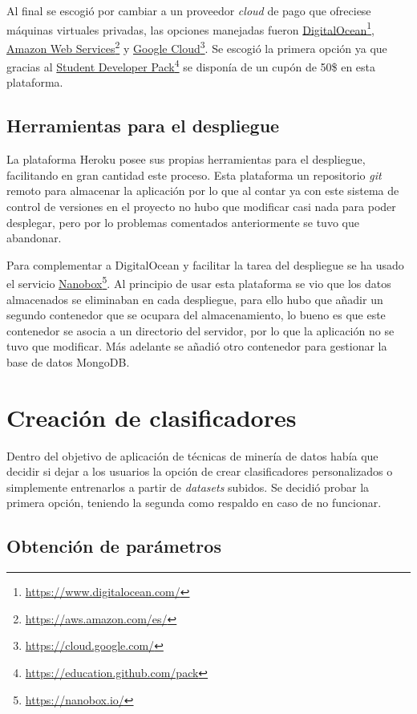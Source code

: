 Al final se escogió por cambiar a un proveedor \textit{cloud} de pago que
ofreciese máquinas virtuales privadas, las opciones manejadas fueron
\href{https://www.digitalocean.com/}{DigitalOcean}\footnote{\url{https://www.digitalocean.com/}},
\href{https://aws.amazon.com/es/}{Amazon Web
	Services}\footnote{\url{https://aws.amazon.com/es/}} y
\href{https://cloud.google.com/}{Google
	Cloud}\footnote{\url{https://cloud.google.com/}}. Se escogió la primera opción
ya que gracias al \href{https://education.github.com/pack}{Student Developer
	Pack}\footnote{\url{https://education.github.com/pack}} se disponía de un cupón
de 50\$ en esta plataforma.

\subsection{Herramientas para el despliegue}

La plataforma Heroku posee sus propias herramientas para el despliegue,
facilitando en gran cantidad este proceso. Esta plataforma un repositorio
\textit{git} remoto para almacenar la aplicación por lo que al contar ya con
este sistema de control de versiones en el proyecto no hubo que modificar casi
nada para poder desplegar, pero por lo problemas comentados anteriormente se
tuvo que abandonar.

Para complementar a DigitalOcean y facilitar la tarea del despliegue se ha usado
el servicio
\href{https://nanobox.io/}{Nanobox}\footnote{\url{https://nanobox.io/}}. Al
principio de usar esta plataforma se vio que los datos almacenados se eliminaban
en cada despliegue, para ello hubo que añadir un segundo contenedor que se
ocupara del almacenamiento, lo bueno es que este contenedor se asocia a un
directorio del servidor, por lo que la aplicación no se tuvo que modificar. Más
adelante se añadió otro contenedor para gestionar la base de datos MongoDB.

\section{Creación de clasificadores}

Dentro del objetivo de aplicación de técnicas de minería de datos había que
decidir si dejar a los usuarios la opción de crear clasificadores personalizados
o simplemente entrenarlos a partir de \textit{datasets} subidos. Se decidió
probar la primera opción, teniendo la segunda como respaldo en caso de no
funcionar.

\subsection{Obtención de parámetros}


